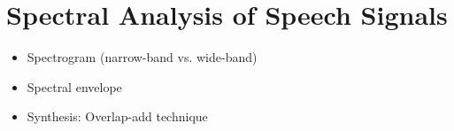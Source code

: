 
\setcounter{chapter}{3}
\chapter{Spectral Analysis of Speech Signals}
\thispagestyle{plain}

\begin{corollary}

	\hspace*{10mm}
	
	\vspace{5mm} %
	
	\begin{itemize}
			\item Spectrogram (narrow-band vs. wide-band)
			\item Spectral envelope
			\item Synthesis: Overlap-add technique
			
	\end{itemize}
\end{corollary}

\newpage





